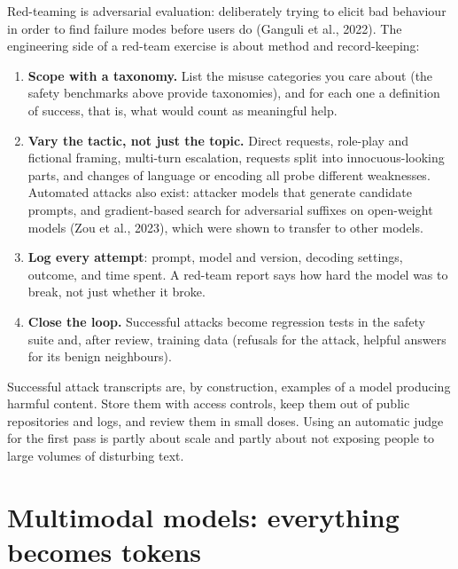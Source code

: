 Red-teaming is adversarial evaluation: deliberately trying to elicit bad behaviour in order to
find failure modes before users do (Ganguli et al., 2022). The engineering side of a red-team
exercise is about method and record-keeping:
\begin{enumerate}
  \item \textbf{Scope with a taxonomy.} List the misuse categories you care about (the safety
        benchmarks above provide taxonomies), and for each one a definition of success, that is,
        what would count as meaningful help.
  \item \textbf{Vary the tactic, not just the topic.} Direct requests, role-play and fictional
        framing, multi-turn escalation, requests split into innocuous-looking parts, and
        changes of language or encoding all probe different weaknesses. Automated attacks also exist: attacker models
        that generate candidate prompts, and gradient-based search for adversarial suffixes on
        open-weight models (Zou et al., 2023), which were shown to transfer to other models.
  \item \textbf{Log every attempt}: prompt, model and version, decoding settings, outcome, and time
        spent. A red-team report says how hard the model was to break, not just whether
        it broke.
  \item \textbf{Close the loop.} Successful attacks become regression tests in the safety suite and,
        after review, training data (refusals for the attack, helpful answers for its benign
        neighbours).
\end{enumerate}

\begin{pitfall}
Successful attack transcripts are, by construction, examples of a model producing harmful
content. Store them with access controls, keep them out of public repositories and logs, and
review them in small doses. Using an automatic judge for the first pass is partly about scale
and partly about not exposing people to large volumes of disturbing text.
\end{pitfall}

\section{Multimodal models: everything becomes tokens}\label{sec:align:mm}



